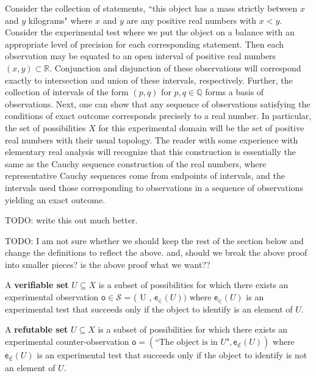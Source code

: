 \documentclass[11pt,letterpaper,fleqn]{memoir} %
\begin{document}
Consider the collection of statements, ``this object has a mass strictly between $x$ and $y$ kilograms" where $x$ and $y$ are any positive real numbers with $x<y$. Consider the experimental test where we put the object on a balance with an appropriate level of precision for each corresponding statement. Then each observation may be equated to an open interval of positive real numbers $(x,y)\subset\mathbb{R}$. Conjunction and disjunction of these observations will correspond exactly to intersection and union of these intervals, respectively. Further, the collection of intervals of the form $(p,q)$ for $p,q\in\mathbb{Q}$ forms a basis of observations. Next, one can show that any sequence of observations satisfying the conditions of exact outcome corresponds precisely to a real number. In particular, the set of possibilities $X$ for this experimental domain will be the set of positive real numbers with their usual topology. The reader with some experience with elementary real analysis will recognize that this construction is essentially the same as the Cauchy sequence construction of the real numbers, where representative Cauchy sequences come from endpoints of intervals, and the intervals used those corresponding to observations in a sequence of observations yielding an exact outcome. 

TODO: write this out much better. 

















TODO: I am not sure whether we should keep the rest of the section below and change the definitions to reflect the above. and, should we break the above proof into smaller pieces? is the above proof what we want??



\begin{defn}
	A \textbf{verifiable set} $U \subseteq X$ is a subset of possibilities for which there exists an experimental observation $\mathsf{o}\in\mathcal{S}$  = ( U , $\mathsf{e}_\in(U))$ where $\mathsf{e}_\in(U)$ is an experimental test that succeeds only if the object to identify is an element of $U$.
\end{defn}

\begin{defn}
	A \textbf{refutable set} $U \subseteq X$ is a subset of possibilities for which there exists an experimental counter-observation $\mathsf{o} = (\text{``The object is in } U \text{"}, \mathsf{e}_{\notin}(U))$ where $\mathsf{e}_{\notin}(U)$ is an experimental test that succeeds only if the object to identify is not an element of $U$.
\end{defn}
\end{document}
